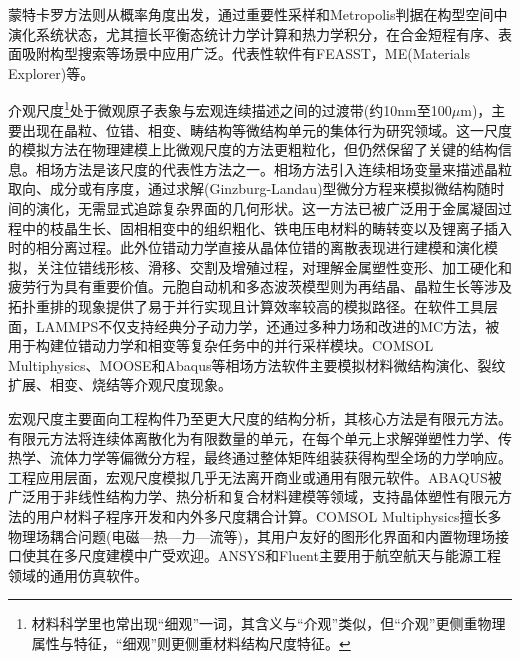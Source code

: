 蒙特卡罗方法则从概率角度出发，通过重要性采样和\textrm{Metropolis}判据在构型空间中演化系统状态，尤其擅长平衡态统计力学计算和热力学积分，在合金短程有序、表面吸附构型搜索等场景中应用广泛。代表性软件有\textrm{FEASST}，\textrm{ME(Materials Explorer)}等。

介观尺度\footnote{材料科学里也常出现``细观''一词，其含义与``介观''类似，但``介观''更侧重物理属性与特征，``细观''则更侧重材料结构尺度特征。}处于微观原子表象与宏观连续描述之间的过渡带(约10\textrm{nm}至100$\mu\mathrm{m}$)，主要出现在晶粒、位错、相变、畴结构等微结构单元的集体行为研究领域。这一尺度的模拟方法在物理建模上比微观尺度的方法更粗粒化，但仍然保留了关键的结构信息。相场方法是该尺度的代表性方法之一。相场方法引入连续相场变量来描述晶粒取向、成分或有序度，通过求解\textrm{(Ginzburg-Landau)}型微分方程来模拟微结构随时间的演化，无需显式追踪复杂界面的几何形状。这一方法已被广泛用于金属凝固过程中的枝晶生长、固相相变中的组织粗化、铁电压电材料的畴转变以及锂离子插入时的相分离过程。此外位错动力学直接从晶体位错的离散表现进行建模和演化模拟，关注位错线形核、滑移、交割及增殖过程，对理解金属塑性变形、加工硬化和疲劳行为具有重要价值。元胞自动机和多态波茨模型则为再结晶、晶粒生长等涉及拓扑重排的现象提供了易于并行实现且计算效率较高的模拟路径。在软件工具层面，\textrm{LAMMPS}不仅支持经典分子动力学，还通过多种力场和改进的\textrm{MC}方法，被用于构建位错动力学和相变等复杂任务中的并行采样模块。\textrm{COMSOL Multiphysics}、\textrm{MOOSE}和\textrm{Abaqus}等相场方法软件主要模拟材料微结构演化、裂纹扩展、相变、烧结等介观尺度现象。

宏观尺度主要面向工程构件乃至更大尺度的结构分析，其核心方法是有限元方法。有限元方法将连续体离散化为有限数量的单元，在每个单元上求解弹塑性力学、传热学、流体力学等偏微分方程，最终通过整体矩阵组装获得构型全场的力学响应。工程应用层面，宏观尺度模拟几乎无法离开商业或通用有限元软件。\textrm{ABAQUS}被广泛用于非线性结构力学、热分析和复合材料建模等领域，支持晶体塑性有限元方法的用户材料子程序开发和内外多尺度耦合计算。\textrm{COMSOL Multiphysics}擅长多物理场耦合问题(电磁—热—力—流等)，其用户友好的图形化界面和内置物理场接口使其在多尺度建模中广受欢迎。\textrm{ANSYS}和\textrm{Fluent}主要用于航空航天与能源工程领域的通用仿真软件。

